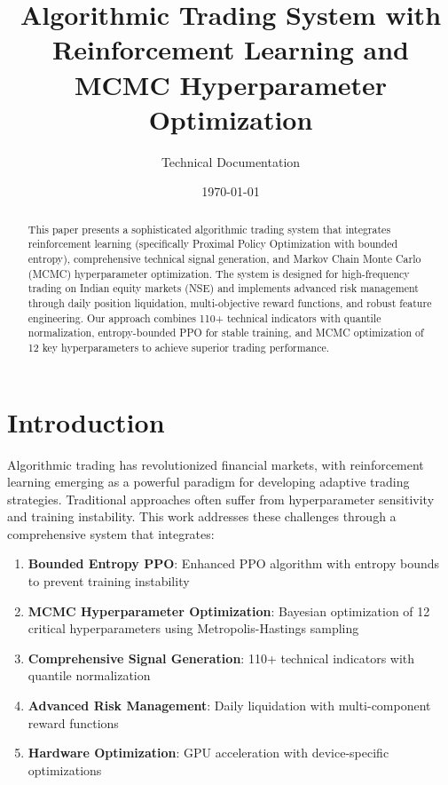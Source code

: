 \documentclass[11pt,a4paper]{article}
\title{\textbf{Algorithmic Trading System with Reinforcement Learning and MCMC Hyperparameter Optimization}}
\author{Technical Documentation}
\date{\today}
\begin{document}
\maketitle

\begin{abstract}
This paper presents a sophisticated algorithmic trading system that integrates reinforcement learning (specifically Proximal Policy Optimization with bounded entropy), comprehensive technical signal generation, and Markov Chain Monte Carlo (MCMC) hyperparameter optimization. The system is designed for high-frequency trading on Indian equity markets (NSE) and implements advanced risk management through daily position liquidation, multi-objective reward functions, and robust feature engineering. Our approach combines 110+ technical indicators with quantile normalization, entropy-bounded PPO for stable training, and MCMC optimization of 12 key hyperparameters to achieve superior trading performance.
\end{abstract}

\tableofcontents
\newpage

\section{Introduction}

Algorithmic trading has revolutionized financial markets, with reinforcement learning emerging as a powerful paradigm for developing adaptive trading strategies. Traditional approaches often suffer from hyperparameter sensitivity and training instability. This work addresses these challenges through a comprehensive system that integrates:

\begin{enumerate}
    \item \textbf{Bounded Entropy PPO}: Enhanced PPO algorithm with entropy bounds to prevent training instability
    \item \textbf{MCMC Hyperparameter Optimization}: Bayesian optimization of 12 critical hyperparameters using Metropolis-Hastings sampling
    \item \textbf{Comprehensive Signal Generation}: 110+ technical indicators with quantile normalization
    \item \textbf{Advanced Risk Management}: Daily liquidation with multi-component reward functions
    \item \textbf{Hardware Optimization}: GPU acceleration with device-specific optimizations
\end{enumerate}
\end{document}
